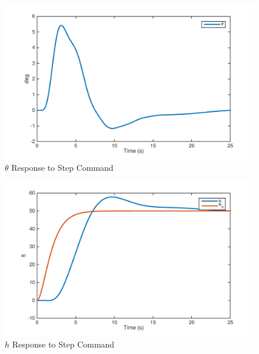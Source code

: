 \documentclass[12pt]{article}
\begin{document}
\begin{figure}[h!]
\begin{center}
\includegraphics[height=.4\textheight]{figures/2_theta}
\caption{$\theta$ Response to Step Command}
\end{center}
\end{figure}

\begin{figure}[h!]
\begin{center}
\includegraphics[height=.39\textheight]{figures/2_h}
\caption{$h$ Response to Step Command}
\end{center}
\end{figure}
\end{document}
